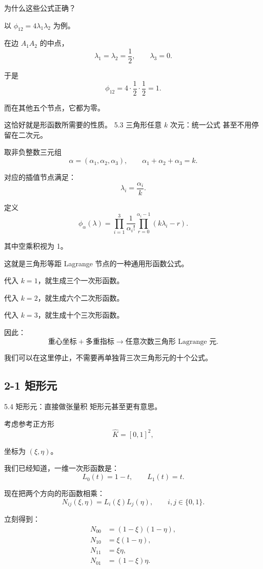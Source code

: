 为什么这些公式正确？

以 \(\phi_{12}=4\lambda_1\lambda_2\) 为例。

在边 \(A_1A_2\) 的中点，
\[
    \lambda_1=\lambda_2=\frac12,\qquad
    \lambda_3=0.
\]

于是
\[
    \phi_{12}=4\cdot\frac12\cdot\frac12=1.
\]

而在其他五个节点，它都为零。

这恰好就是形函数所需要的性质。
5.3 三角形任意 \(k\) 次元：统一公式
甚至不用停留在二次元。

取非负整数三元组
\[
    \alpha=(\alpha_1,\alpha_2,\alpha_3),\qquad
    \alpha_1+\alpha_2+\alpha_3=k.
\]

对应的插值节点满足：
\[
    \lambda_i=\frac{\alpha_i}{k}.
\]

定义
\[
    \boxed{
        \phi_\alpha(\lambda)
        =
        \prod_{i=1}^3
        \frac1{\alpha_i!}
        \prod_{r=0}^{\alpha_i-1}(k\lambda_i-r).
    }
\]

其中空乘积视为 1。

这就是三角形等距 Lagrange 节点的一种通用形函数公式。

代入 \(k=1\)，就生成三个一次形函数。

代入 \(k=2\)，就生成六个二次形函数。

代入 \(k=3\)，就生成十个三次形函数。

因此：
\[
    \boxed{
        \text{重心坐标}+\text{多重指标}
        \longrightarrow
        \text{任意次数三角形 Lagrange 元}.
    }
\]

我们可以在这里停止，不需要再单独背三次三角形元的十个公式。


\subsection{2-1 矩形元}
5.4 矩形元：直接做张量积
矩形元甚至更有意思。

考虑参考正方形
\[
    \widehat K=[0,1]^2,
\]

坐标为 \((\xi,\eta)\)。

我们已经知道，一维一次形函数是：
\[
    L_0(t)=1-t,\qquad L_1(t)=t.
\]

现在把两个方向的形函数相乘：
\[
    \boxed{
        N_{ij}(\xi,\eta)=L_i(\xi)L_j(\eta),
        \qquad i,j\in\{0,1\}.
    }
\]

立刻得到：
\[
    \boxed{
        \begin{aligned}
            N_{00} & =(1-\xi)(1-\eta), \\
            N_{10} & =\xi(1-\eta),     \\
            N_{11} & =\xi\eta,         \\
            N_{01} & =(1-\xi)\eta.
        \end{aligned}
    }
\]

